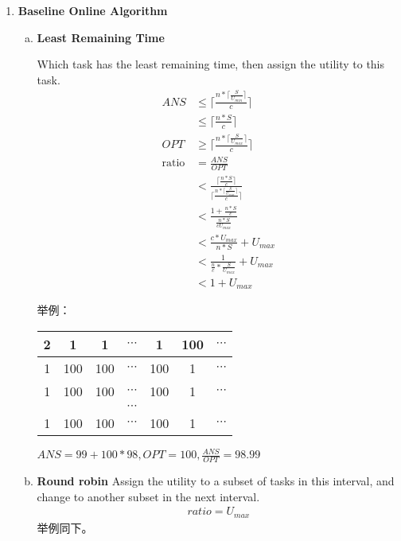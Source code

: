 \documentclass[UTF8]{ctexart}
\newcommand{\Emph}{\textbf}
\begin{document}
\begin{enumerate}[I]
\begin{enumerate}[(a)]
	\end{enumerate}
	
    
    \newpage
	\item \Emph{Baseline Online Algorithm}
	\begin{enumerate}[(a)]
		\item \Emph{Least Remaining Time}
		
		Which task has the least remaining time, then assign the utility to this task.
		\begin{align*}
			ANS &\le \lceil \frac{n * \lceil \frac{S}{U_{min}} \rceil}{c} \rceil \\
				&\le \lceil \frac{n*S}{c} \rceil \\
			OPT &\ge \lceil \frac{n*\lceil \frac{S}{U_{max}} \rceil}{c} \rceil \\
			\text{ratio} &= \frac{ANS}{OPT} \\
						 &< \frac{\lceil \frac{n*S}{c} \rceil}{ \lceil \frac{n*\lceil \frac{S}{U_{max}} \rceil}{c} \rceil } \\
						 &< \frac{1 + \frac{n*S}{c}}{\frac{n*S}{cU_{max}}} \\
						 &< \frac{c*U_{max}}{n*S} + U_{max} \\
						 &< \frac{1}{\frac{n}{c} * \frac{S}{U_{max}}} + U_{max} \\
						 &< 1 + U_{max} 
		\end{align*}
		
		举例：
		\begin{center}
		\begin{tabular}{|c|c|c|c|c|c|c|}
			\hline
			2 &1 &1 &$\cdots$ &1 &100 &$\cdots$ \\
			\hline
			1 &100 &100 &$\cdots$ &100 &1 &$\cdots$ \\	
			1 &100 &100 &$\cdots$ &100 &1 &$\cdots$ \\	
			\quad &\quad &\quad &$\cdots$ &\quad &\quad &\quad  \\
			1 &100 &100 &$\cdots$ &100 &1 &$\cdots$ \\	
			\hline
		\end{tabular}
		\end{center}
	
		$ANS = 99+100*98, OPT = 100, \frac{ANS}{OPT} = 98.99$
		
		\item \Emph{Round robin}
		Assign the utility to a subset of tasks in this interval, and change to another subset in the next interval.
		\begin{align*}
			ratio = U_{max}
		\end{align*}
		举例同下。
		

\end{enumerate}
\end{enumerate}
\end{document}
